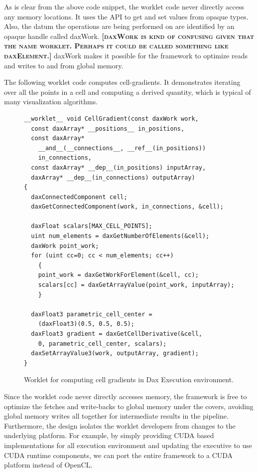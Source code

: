 \documentclass{vgtc}                          %
\newcommand{\fix}[1]{{\color{red}\textbf{\textsc{[#1]}}}}
\begin{document}
As is clear from the above code snippet, the worklet code never directly access
any memory locations. It uses the API to get and set values from opaque types. Also,
the datum the operations are being performed on are identified by an opaque
handle called daxWork. \fix{daxWork is kind of confusing given that the name worklet.  Perhaps it could be called something like daxElement.} daxWork makes it possible for the framework to optimize
reads and writes to and from global memory.

The following worklet code computes cell-gradients. It demonstrates
iterating over all the points in a cell and computing a derived quantity, which
is typical of many visualization algorithms.

\begin{figure}[htbp]
\centering
{\small
\begin{verbatim}
__worklet__ void CellGradient(const daxWork work,
  const daxArray* __positions__ in_positions,
  const daxArray*
    __and__(__connections__, __ref__(in_positions))
    in_connections,
  const daxArray* __dep__(in_positions) inputArray,
  daxArray* __dep__(in_connections) outputArray)
{
  daxConnectedComponent cell;
  daxGetConnectedComponent(work, in_connections, &cell);

  daxFloat scalars[MAX_CELL_POINTS];
  uint num_elements = daxGetNumberOfElements(&cell);
  daxWork point_work;
  for (uint cc=0; cc < num_elements; cc++)
    {
    point_work = daxGetWorkForElement(&cell, cc);
    scalars[cc] = daxGetArrayValue(point_work, inputArray);
    }

  daxFloat3 parametric_cell_center =
    (daxFloat3)(0.5, 0.5, 0.5);
  daxFloat3 gradient = daxGetCellDerivative(&cell,
    0, parametric_cell_center, scalars);
  daxSetArrayValue3(work, outputArray, gradient);
}
\end{verbatim} }
\caption{Worklet for computing cell gradients in Dax Execution environment.}
\label{fig:DaxCellGradientWorklet}
\end{figure}

Since the worklet code never directly accesses memory, the framework is free to
optimize the fetches and write-backs to global memory under the covers, avoiding
global memory writes all together for intermediate results in the pipeline.
Furthermore, the design isolates the worklet developers from changes to the
underlying platform. For example, by simply providing CUDA based implementations
for all execution environment and updating the executive to use CUDA runtime components, we
can port the entire framework to a CUDA platform instead of OpenCL.
\end{document}

